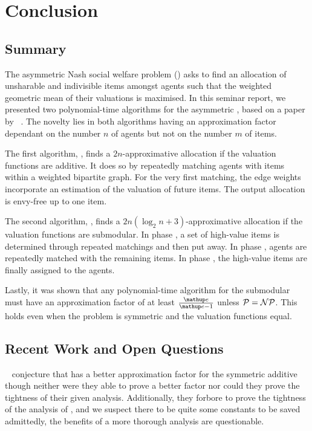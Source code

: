 \section{Conclusion}
\label{sec:conclusion}

\subsection{Summary}
\label{subsec:conclusion:summary}

The asymmetric Nash social welfare problem (\NSW) asks to find an allocation of unsharable and indivisible items amongst agents such that the weighted geometric mean of their valuations is maximised.
In this seminar report, we presented two polynomial-time algorithms for the asymmetric \NSW, based on a paper by \citeauthor{APNSWuSVþUM}~\cite{APNSWuSVþUM}.
The novelty lies in both algorithms having an approximation factor dependant on the number \(n\) of agents but not on the number \(m\) of items.

The first algorithm, \SMatch, finds a \(2n\)-approximative allocation if the valuation functions are additive.
It does so by repeatedly matching agents with items within a weighted bipartite graph.
For the very first matching, the edge weights incorporate an estimation of the valuation of future items.
The output allocation is envy-free up to one item.

The second algorithm, \RepReMatch, finds a \(2n(\log_2 n + 3)\)-approximative allocation if the valuation functions are submodular.
In phase \phasei, a set of high-value items is determined through repeated matchings and then put away.
In phase \phaseii, agents are repeatedly matched with the remaining items.
In phase \phaseiii, the high-value items are finally assigned to the agents.

Lastly, it was shown that any polynomial-time algorithm for the submodular \NSW{} must have an approximation factor of at least \(\frac{\euler}{\euler - 1}\) unless \(\mathcal{P} = \mathcal{N\kern-0.025em P}\).
This holds even when the problem is symmetric and the valuation functions equal.

\subsection{Recent Work and Open Questions}
\label{subsec:conclusion:outlook}

~\cite{APNSWuSVþUM} conjecture that \SMatch{} has a better approximation factor for the symmetric additive \NSW{} though neither were they able to prove a better factor nor could they prove the tightness of their given analysis.
Additionally, they forbore to prove the tightness of the analysis of \RepReMatch{}, and we suspect there to be quite some constants to be saved \Dash admittedly, the benefits of a more thorough analysis are questionable.

